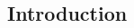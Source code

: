\documentclass[11pt, a4paper, logo, copyright, nonumbering]{deepseek}
\begin{document}
\begin{CJK*}{UTF8}{gbsn}
\section{Introduction}






\end{CJK*}
\end{document}
